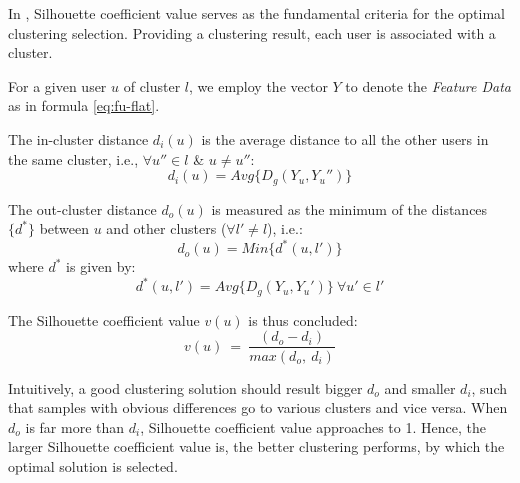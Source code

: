 In \sys{}, Silhouette coefficient value serves as the fundamental criteria for the optimal clustering selection.
Providing a clustering result, each user is associated with a cluster.

For a given user $u$ of cluster $l$, we employ the vector $Y$ to denote the \textit{Feature Data} as in formula \ref{eq:fu-flat}.

\begin{definition}
\label{def:di}
The in-cluster distance $d_i(u)$ is the average distance to all the other users in the same cluster, i.e., $\forall u'' \in l$ \& $u \neq u''$:
\begin{equation}
	d_i(u) = Avg\{D_g(Y_u, Y_u'')\}
\end{equation}
\end{definition}

\begin{definition}
\label{def:do}
The out-cluster distance $d_o(u)$ is measured as the minimum of the distances $\{d^{\ast}\}$ between $u$ and other clusters ($\forall l' \neq l$), i.e.:
\begin{equation}
	d_o(u) = Min\{d^{\ast}(u, l')\}
\end{equation}
where $d^{\ast}$ is given by:
\begin{equation}
	d^{\ast}(u, l') = Avg\{D_g(Y_u, Y_u')\}\ \forall u' \in l'
\end{equation}
\end{definition}

\begin{definition}
\label{def:coef}
The Silhouette coefficient value $v(u)$ is thus concluded:
\begin{equation}
\label{eq:coef}
v(u)\ =\ \frac{(d_o - d_i)}{max(d_o,\ d_i)}	
\end{equation}
\end{definition}

Intuitively, a good clustering solution should result bigger $d_o$ and smaller $d_i$, such that samples with obvious differences go to various clusters and vice versa.
When $d_o$ is far more than $d_i$, Silhouette coefficient value approaches to 1.
Hence, the larger Silhouette coefficient value is, the better clustering performs, by which the optimal solution is selected.





